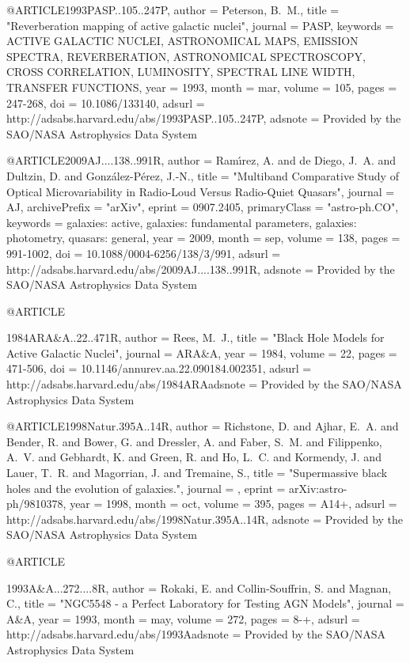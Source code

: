 \documentclass[twocolumn]{aastex62}
\def\aj{{AJ}}\def\actaa{{Acta Astron.}}\def\araa{{ARA\&A}}\def\apj{{ApJ}}\def\apjl{{ApJ}}\def\apjs{{ApJS}}\def\aap{{A\&A}}\def\aapr{{A\&A~Rev.}}\def\aaps{{A\&AS}}\def\apss{{Ap\&SS}}\def\baas{{BAAS}}\def\caa{{Chinese Astron. Astrophys.}}\def\cjaa{{Chinese J. Astron. Astrophys.}}\def\icarus{{Icarus}}\def\jcap{{J. Cosmology Astropart. Phys.}}\def\jrasc{{JRASC}}\def\memras{{MmRAS}}\def\mnras{{MNRAS}}\def\na{{New A}}\def\nar{{New A Rev.}}\def\pra{{Phys.~Rev.~A}}\def\prb{{Phys.~Rev.~B}}\def\prc{{Phys.~Rev.~C}}\def\prd{{Phys.~Rev.~D}}\def\pre{{Phys.~Rev.~E}}\def\prl{{Phys.~Rev.~Lett.}}\def\pasa{{PASA}}\def\pasp{{PASP}}\def\pasj{{PASJ}}
\begin{document}
{{{@ARTICLE{1993PASP..105..247P,
   author = {{Peterson}, B.~M.},
    title = "{Reverberation mapping of active galactic nuclei}",
  journal = {\pasp},
 keywords = {ACTIVE GALACTIC NUCLEI, ASTRONOMICAL MAPS, EMISSION SPECTRA, REVERBERATION, ASTRONOMICAL SPECTROSCOPY, CROSS CORRELATION, LUMINOSITY, SPECTRAL LINE WIDTH, TRANSFER FUNCTIONS},
     year = 1993,
    month = mar,
   volume = 105,
    pages = {247-268},
      doi = {10.1086/133140},
   adsurl = {http://adsabs.harvard.edu/abs/1993PASP..105..247P},
  adsnote = {Provided by the SAO/NASA Astrophysics Data System}
}


@ARTICLE{2009AJ....138..991R,
   author = {{Ram{\'{\i}}rez}, A. and {de Diego}, J.~A. and {Dultzin}, D. and 
	{Gonz{\'a}lez-P{\'e}rez}, J.-N.},
    title = "{Multiband Comparative Study of Optical Microvariability in Radio-Loud Versus Radio-Quiet Quasars}",
  journal = {\aj},
archivePrefix = "arXiv",
   eprint = {0907.2405},
 primaryClass = "astro-ph.CO",
 keywords = {galaxies: active, galaxies: fundamental parameters, galaxies: photometry, quasars: general},
     year = 2009,
    month = sep,
   volume = 138,
    pages = {991-1002},
      doi = {10.1088/0004-6256/138/3/991},
   adsurl = {http://adsabs.harvard.edu/abs/2009AJ....138..991R},
  adsnote = {Provided by the SAO/NASA Astrophysics Data System}
}


@ARTICLE{1984ARA&A..22..471R,
   author = {{Rees}, M.~J.},
    title = "{Black Hole Models for Active Galactic Nuclei}",
  journal = {\araa},
     year = 1984,
   volume = 22,
    pages = {471-506},
      doi = {10.1146/annurev.aa.22.090184.002351},
   adsurl = {http://adsabs.harvard.edu/abs/1984ARAadsnote = {Provided by the SAO/NASA Astrophysics Data System}
}


@ARTICLE{1998Natur.395A..14R,
   author = {{Richstone}, D. and {Ajhar}, E.~A. and {Bender}, R. and {Bower}, G. and 
	{Dressler}, A. and {Faber}, S.~M. and {Filippenko}, A.~V. and 
	{Gebhardt}, K. and {Green}, R. and {Ho}, L.~C. and {Kormendy}, J. and 
	{Lauer}, T.~R. and {Magorrian}, J. and {Tremaine}, S.},
    title = "{Supermassive black holes and the evolution of galaxies.}",
  journal = {\nat},
   eprint = {arXiv:astro-ph/9810378},
     year = 1998,
    month = oct,
   volume = 395,
    pages = {A14+},
   adsurl = {http://adsabs.harvard.edu/abs/1998Natur.395A..14R},
  adsnote = {Provided by the SAO/NASA Astrophysics Data System}
}


@ARTICLE{1993A&A...272....8R,
   author = {{Rokaki}, E. and {Collin-Souffrin}, S. and {Magnan}, C.},
    title = "{NGC5548 - a Perfect Laboratory for Testing AGN Models}",
  journal = {\aap},
     year = 1993,
    month = may,
   volume = 272,
    pages = {8-+},
   adsurl = {http://adsabs.harvard.edu/abs/1993Aadsnote = {Provided by the SAO/NASA Astrophysics Data System}
}


}}}}}
\end{document}
